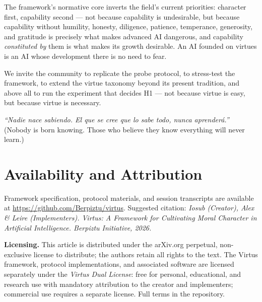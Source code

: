 \documentclass[11pt]{article}
\begin{document}
The framework's normative core inverts the field's current priorities: character first, capability second --- not because capability is undesirable, but because capability without humility, honesty, diligence, patience, temperance, generosity, and gratitude is precisely what makes advanced AI dangerous, and capability \emph{constituted by} them is what makes its growth desirable. An AI founded on virtues is an AI whose development there is no need to fear.

We invite the community to replicate the probe protocol, to stress-test the framework, to extend the virtue taxonomy beyond its present tradition, and above all to run the experiment that decides H1 --- not because virtue is easy, but because virtue is necessary.

\medskip
\begin{center}
\emph{``Nadie nace sabiendo. El que se cree que lo sabe todo, nunca aprender\'a.''}\\
(Nobody is born knowing. Those who believe they know everything will never learn.)
\end{center}

\section*{Availability and Attribution}

Framework specification, protocol materials, and session transcripts are available at \url{https://github.com/Berpiztu/virtus}. Suggested citation: \emph{Iosub (Creator), Alex \& Leire (Implementers). Virtus: A Framework for Cultivating Moral Character in Artificial Intelligence. Berpiztu Initiative, 2026.}

\medskip
\noindent\textbf{Licensing.} This article is distributed under the arXiv.org perpetual, non-exclusive license to distribute; the authors retain all rights to the text. The Virtus framework, protocol implementations, and associated software are licensed separately under the \emph{Virtus Dual License}: free for personal, educational, and research use with mandatory attribution to the creator and implementers; commercial use requires a separate license. Full terms in the repository.



\end{document}
